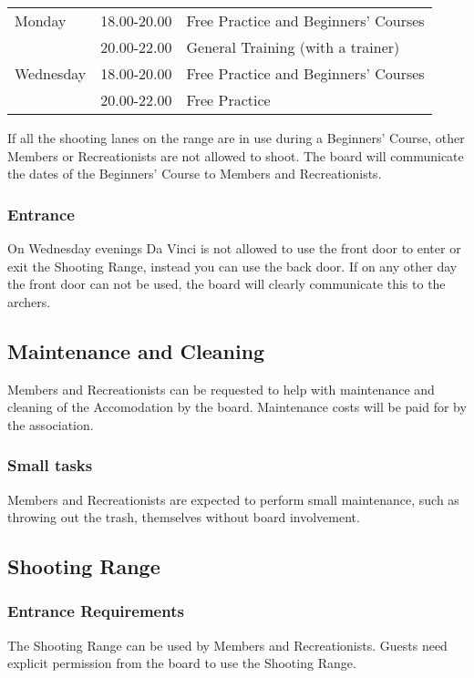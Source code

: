 \documentclass[a4paper]{article}
\begin{document}
\begin{tabular}{lll}
Monday    & 18.00-20.00 & Free Practice  and { Beginners’ Course}s \\
          & 20.00-22.00 & { General Training} (with a trainer)     \\
Wednesday & 18.00-20.00 & Free Practice and  { Beginners’ Course}s  \\
          & 20.00-22.00 & Free Practice                        
\end{tabular}

\bigskip

If all the shooting lanes on the range are in use during a { Beginners’ Course}, other { Members} or { Recreationists} are not allowed to shoot. The board will communicate the dates of the { Beginners’ Course} to { Members} and { Recreationists}.

\subsubsection{Entrance}
On Wednesday evenings Da Vinci is not allowed to use the front door to enter or exit the Shooting Range, instead you can use the back door. If on any other day the front door can not be used, the board will clearly communicate this to the { archers}. 

\subsection{Maintenance and Cleaning}
{ Members} and { Recreationists} can be requested to help with maintenance and cleaning of the { Accomodation} by the board. Maintenance costs will be paid for by the association.

\subsubsection{Small tasks}
{ Members} and { Recreationists} are expected to perform small maintenance, such as throwing out the trash, themselves without board involvement.

\subsection{Shooting Range}
\subsubsection{Entrance Requirements}
The Shooting Range can be used by { Members} and { Recreationists}. { Guests} need explicit permission from the board to use the Shooting Range. 
\end{document}
